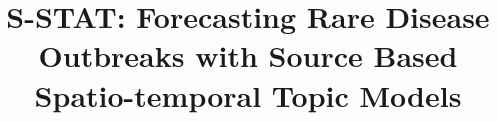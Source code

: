 \documentclass[conference]{IEEEtran}
\newcommand{\fullmodel}{{S-STAT}\xspace}
\begin{document}

\title{\fullmodel: Forecasting Rare Disease Outbreaks with Source Based Spatio-temporal Topic Models}

\end{document}
